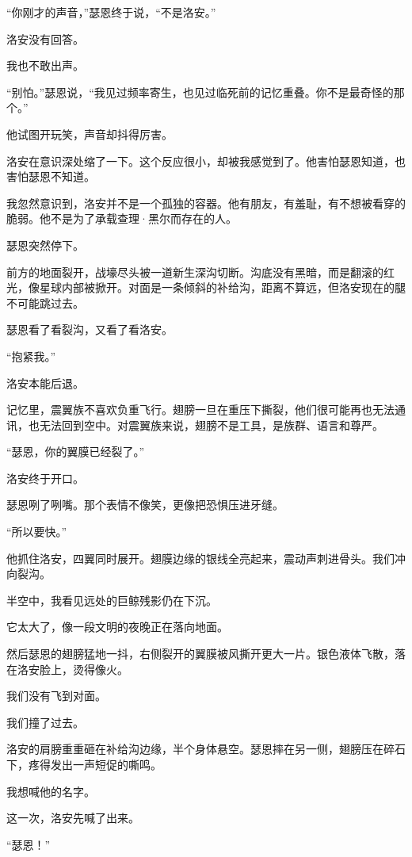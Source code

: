 “你刚才的声音，”瑟恩终于说，“不是洛安。”

洛安没有回答。

我也不敢出声。

“别怕。”瑟恩说，“我见过频率寄生，也见过临死前的记忆重叠。你不是最奇怪的那个。”

他试图开玩笑，声音却抖得厉害。

洛安在意识深处缩了一下。这个反应很小，却被我感觉到了。他害怕瑟恩知道，也害怕瑟恩不知道。

我忽然意识到，洛安并不是一个孤独的容器。他有朋友，有羞耻，有不想被看穿的脆弱。他不是为了承载查理·黑尔而存在的人。

瑟恩突然停下。

前方的地面裂开，战壕尽头被一道新生深沟切断。沟底没有黑暗，而是翻滚的红光，像星球内部被掀开。对面是一条倾斜的补给沟，距离不算远，但洛安现在的腿不可能跳过去。

瑟恩看了看裂沟，又看了看洛安。

“抱紧我。”

洛安本能后退。

记忆里，震翼族不喜欢负重飞行。翅膀一旦在重压下撕裂，他们很可能再也无法通讯，也无法回到空中。对震翼族来说，翅膀不是工具，是族群、语言和尊严。

“瑟恩，你的翼膜已经裂了。”

洛安终于开口。

瑟恩咧了咧嘴。那个表情不像笑，更像把恐惧压进牙缝。

“所以要快。”

他抓住洛安，四翼同时展开。翅膜边缘的银线全亮起来，震动声刺进骨头。我们冲向裂沟。

半空中，我看见远处的巨鲸残影仍在下沉。

它太大了，像一段文明的夜晚正在落向地面。

然后瑟恩的翅膀猛地一抖，右侧裂开的翼膜被风撕开更大一片。银色液体飞散，落在洛安脸上，烫得像火。

我们没有飞到对面。

我们撞了过去。

洛安的肩膀重重砸在补给沟边缘，半个身体悬空。瑟恩摔在另一侧，翅膀压在碎石下，疼得发出一声短促的嘶鸣。

我想喊他的名字。

这一次，洛安先喊了出来。

“瑟恩！”
